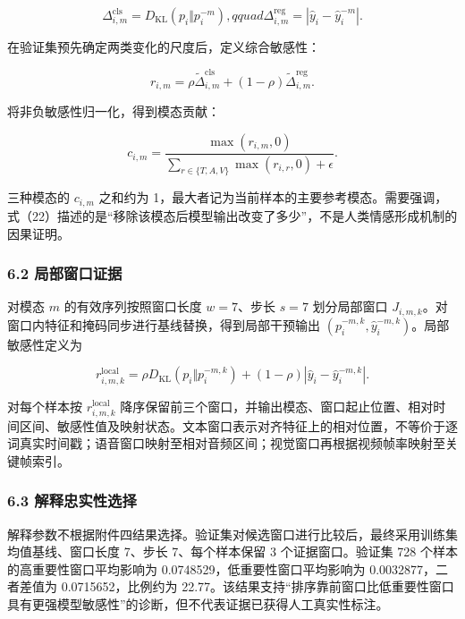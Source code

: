 \documentclass[
  12pt,
  a4paper,
]{ctexart}
\begin{document}
\[
\Delta_{i,m}^{\mathrm{cls}}=D_{\mathrm{KL}}(p_i\Vert p_i^{-m}),qquad
\Delta_{i,m}^{\mathrm{reg}}=|\hat y_i-\hat y_i^{-m}|.
\tag{20}
\]

在验证集预先确定两类变化的尺度后，定义综合敏感性：

\[
r_{i,m}=\rho\widetilde{\Delta}_{i,m}^{\mathrm{cls}}
 +(1-\rho)\widetilde{\Delta}_{i,m}^{\mathrm{reg}}.
\tag{21}
\]

将非负敏感性归一化，得到模态贡献：

\[
c_{i,m}=\frac{\max(r_{i,m},0)}
{\sum_{r\in\{T,A,V\}}\max(r_{i,r},0)+\epsilon}.
\tag{22}
\]

三种模态的 \(c_{i,m}\) 之和约为
1，最大者记为当前样本的主要参考模态。需要强调，式（22）描述的是``移除该模态后模型输出改变了多少''，不是人类情感形成机制的因果证明。

\hypertarget{ux5c40ux90e8ux7a97ux53e3ux8bc1ux636e}{%
\subsubsection{6.2
局部窗口证据}\label{ux5c40ux90e8ux7a97ux53e3ux8bc1ux636e}}

对模态 \(m\) 的有效序列按照窗口长度 \(w=7\)、步长 \(s=7\) 划分局部窗口
\(J_{i,m,k}\)。对窗口内特征和掩码同步进行基线替换，得到局部干预输出
\((p_i^{-m,k},\hat y_i^{-m,k})\)。局部敏感性定义为

\[
r_{i,m,k}^{\mathrm{local}}=
\rho D_{\mathrm{KL}}(p_i\Vert p_i^{-m,k})
 +(1-\rho)|\hat y_i-\hat y_i^{-m,k}|.
\tag{23}
\]

对每个样本按 \(r_{i,m,k}^{\mathrm{local}}\)
降序保留前三个窗口，并输出模态、窗口起止位置、相对时间区间、敏感性值及映射状态。文本窗口表示对齐特征上的相对位置，不等价于逐词真实时间戳；语音窗口映射至相对音频区间；视觉窗口再根据视频帧率映射至关键帧索引。

\hypertarget{ux89e3ux91caux5fe0ux5b9eux6027ux9009ux62e9}{%
\subsubsection{6.3
解释忠实性选择}\label{ux89e3ux91caux5fe0ux5b9eux6027ux9009ux62e9}}

解释参数不根据附件四结果选择。验证集对候选窗口进行比较后，最终采用训练集均值基线、窗口长度
7、步长 7、每个样本保留 3 个证据窗口。验证集 728
个样本的高重要性窗口平均影响为 0.0748529，低重要性窗口平均影响为
0.0032877，二者差值为 0.0715652，比例约为
22.77。该结果支持``排序靠前窗口比低重要性窗口具有更强模型敏感性''的诊断，但不代表证据已获得人工真实性标注。
\end{document}
